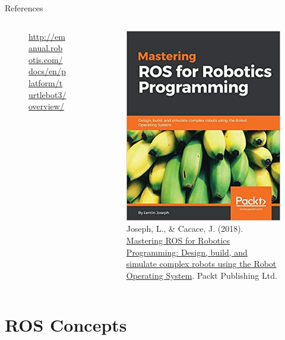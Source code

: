 \begin{frame}{References}
\begin{columns}[b]
\begin{column}{.32\textwidth}
\begin{figure}
{  \url{http://emanual.robotis.com/docs/en/platform/turtlebot3/overview/}}
 \end{figure}
\end{column}
\begin{column}{.32\textwidth}
 \begin{figure}
  \includegraphics[width=.5\columnwidth]{./img/ros/masteringbook.jpg}
  \caption{Joseph, L., \& Cacace, J. (2018). \href{https://www.amazon.es/Mastering-Robotics-Programming-Lentin-Joseph/dp/1783551798}{Mastering ROS for Robotics Programming: Design, build, and simulate complex robots using the Robot Operating System}. Packt Publishing Ltd.}
 \end{figure}
\end{column}
\end{columns}
\end{frame}



\section{ROS Concepts}

